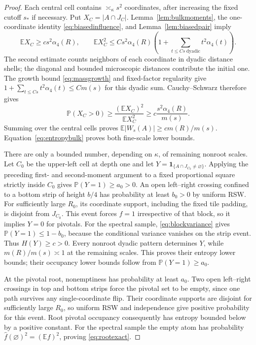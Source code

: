 \documentclass[11pt]{amsart}
\theoremstyle{remark}
\newcommand{\Prob}{\mathbb P}
\newcommand{\E}{\mathbb E}
\newcommand{\one}{\mathbf 1}
\begin{document}
\begin{proof}
Each central cell contains $\asymp_\kappa s^2$ coordinates, after increasing the fixed cutoff $s_*$ if necessary. Put $X_C=|A\cap J_C|$. Lemma~\ref{lem:bulkmoments}, the one-coordinate identity \eqref{eq:biasedinfluence}, and Lemma~\ref{lem:biasedpair} imply
\[
 \E X_C\ge cs^2\alpha_4(R),\qquad
 \E X_C^2\le Cs^2\alpha_4(R)
             \left(1+\sum_{t\le Cs\ \mathrm{dyadic}}t^2\alpha_4(t)\right).
\]
The second estimate counts neighbors of each coordinate in dyadic distance shells; the diagonal and bounded microscopic distances contribute the initial one. The growth bound \eqref{eq:massgrowth} and fixed-factor regularity give $1+\sum_{t\le Cs}t^2\alpha_4(t)\le Cm(s)$ for this dyadic sum. Cauchy--Schwarz therefore gives
\[
 \Prob(X_C>0)\ge\frac{(\E X_C)^2}{\E X_C^2}
 \ge c\frac{s^2\alpha_4(R)}{m(s)}.
\]
Summing over the central cells proves $\E|W_s(A)|\ge cm(R)/m(s)$. Equation~\eqref{eq:entropybulk} proves both fine-scale lower bounds.

There are only a bounded number, depending on $\kappa$, of remaining nonroot scales. Let $C_0$ be the upper-left cell at depth one and let $Y=\one_{\{A\cap J_{C_0}\ne\varnothing\}}$. Applying the preceding first- and second-moment argument to a fixed proportional square strictly inside $C_0$ gives $\Prob(Y=1)\ge a_0>0$. An open left--right crossing confined to a bottom strip of height $b/4$ has probability at least $b_0>0$ by uniform RSW. For sufficiently large $R_0$, its coordinate support, including the fixed tile padding, is disjoint from $J_{C_0}$. This event forces $f=1$ irrespective of that block, so it implies $Y=0$ for pivotals. For the spectral sample, \eqref{eq:blockvariance} gives $\Prob(Y=1)\le1-b_0$, because the conditional variance vanishes on the strip event. Thus $H(Y)\ge c>0$. Every nonroot dyadic pattern determines $Y$, while $m(R)/m(s)\asymp1$ at the remaining scales. This proves their entropy lower bounds; their occupancy lower bounds follow from $\Prob(Y=1)\ge a_0$.

At the pivotal root, nonemptiness has probability at least $a_0$. Two open left--right crossings in top and bottom strips force the pivotal set to be empty, since one path survives any single-coordinate flip. Their coordinate supports are disjoint for sufficiently large $R_0$, so uniform RSW and independence give positive probability for this event. Root pivotal occupancy consequently has entropy bounded below by a positive constant. For the spectral sample the empty atom has probability $\widehat f(\varnothing)^2=(\E f)^2$, proving \eqref{eq:rootexact}.
\end{proof}
\end{document}
